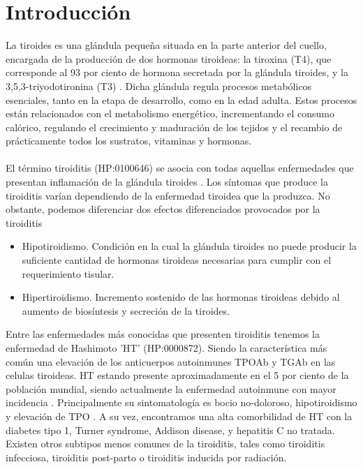 \section{Introducción}
La tiroides es una glándula pequeña situada en la parte anterior del cuello, encargada de la producción de dos hormonas tiroideas: la tiroxina (T4), que 
corresponde al 93 por ciento de hormona secretada por la glándula tiroides, y la 3,5,3-triyodotironina (T3) \cite{gray1918} . Dicha glándula regula procesos metabólicos esenciales, tanto en la etapa de desarrollo, como en la edad adulta. Estos procesos están relacionados con el metabolismo energético, incrementando el consumo calórico, regulando el crecimiento y maduración de los tejidos y el recambio de prácticamente todos los sustratos, vitaminas y hormonas.  \cite{gray1918} 
\\ \\
El término tiroiditis (HP:0100646) se asocia con todas aquellas enfermedades que presentan inflamación de la glándula tiroides \cite{Sweeney2014}. Los síntomas que produce la tiroiditis varían dependiendo de la enfermedad tiroidea que la produzca. No obstante, podemos diferenciar dos efectos diferenciados provocados por la tiroiditis \cite{Pulgarin2016}
\begin{itemize}
    \item Hipotiroidismo. Condición en la cual la glándula tiroides no puede producir la suficiente cantidad de hormonas tiroideas necesarias para cumplir con el requerimiento tisular.
    \item Hipertiroidismo. Incremento sostenido de las hormonas tiroideas debido al aumento de biosíntesis y secreción de la tiroides.
\end{itemize} 
Entre las enfermedades más conocidas que presenten tiroiditis tenemos la enfermedad de Hashimoto 'HT' (HP:0000872). Siendo la característica más común una elevación de los anticuerpos autoinmunes TPOAb y TGAb en las celulas tiroideas. HT estando presente aproximadamente en el 5 por ciento de la población mundial, siendo actualmente la enfermedad autoinmune con mayor incidencia \cite{Zheng2020}. Principalmente su sintomatología es bocio no-doloroso, hipotiroidismo y elevación de TPO \cite{Sweeney2014}. A su vez, encontramos una alta comorbilidad de HT con la diabetes tipo 1, Turner syndrome, Addison disease, y hepatitis C no tratada.\cite{Sweeney2014} 
Existen otros subtipos menos comunes de la tiroiditis, tales como tiroiditis infecciosa, tiroiditis post-parto o tiroiditis inducida por radiación. \cite{Sweeney2014, Synoracki2016}  
